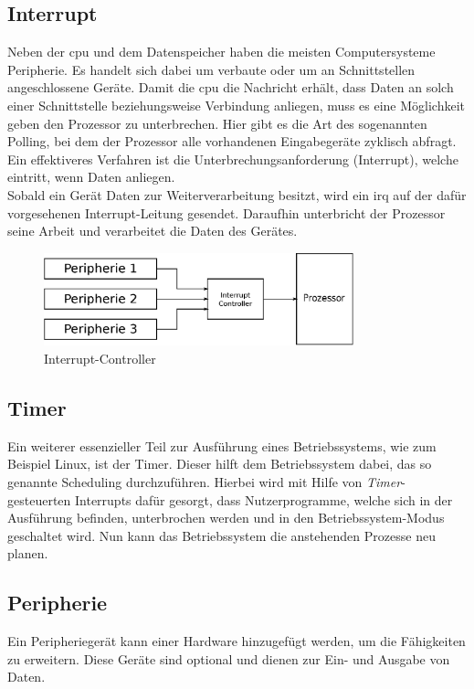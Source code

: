  \subsection{Interrupt}\label{kap:interrupt}
 Neben der \ac{cpu} und dem Datenspeicher haben die meisten Computersysteme Peripherie. Es handelt sich dabei um verbaute oder um an Schnittstellen angeschlossene Geräte.
 Damit die \ac{cpu} die Nachricht erhält, dass Daten an solch einer Schnittstelle beziehungsweise Verbindung anliegen, muss es eine Möglichkeit geben den Prozessor zu
 unterbrechen. Hier gibt es die Art des sogenannten Polling, bei dem der Prozessor alle vorhandenen Eingabegeräte zyklisch abfragt. Ein effektiveres Verfahren ist die
 Unterbrechungsanforderung (Interrupt), welche eintritt, wenn Daten anliegen. \\
 Sobald ein Gerät Daten zur Weiterverarbeitung besitzt, wird ein \ac{irq} auf der dafür vorgesehenen Interrupt-Leitung gesendet. Daraufhin unterbricht der Prozessor
 seine Arbeit und verarbeitet die Daten des Gerätes.\cite{irq}\\

 \begin{figure}[H]
 \centering
 \includegraphics[width=0.8\textwidth]{Hauptteil/irq.eps}
 \caption{Interrupt-Controller}\label{fig:irq}
 \end{figure}

 \subsection{Timer}\label{kap:timer}

 Ein weiterer essenzieller Teil zur Ausführung eines Betriebssystems, wie zum Beispiel Linux, ist der Timer. Dieser hilft dem Betriebssystem dabei, das so genannte Scheduling
 durchzuführen. Hierbei wird mit Hilfe von \emph{Timer}-gesteuerten Interrupts dafür gesorgt, dass Nutzerprogramme, welche sich in der Ausführung befinden, unterbrochen werden und
 in den Betriebssystem-Modus geschaltet wird. Nun kann das Betriebssystem die anstehenden Prozesse neu planen.\\

 \subsection{Peripherie}\label{kap:peripherie}
 Ein Peripheriegerät kann einer Hardware hinzugefügt werden, um die Fähigkeiten zu erweitern. Diese Geräte sind optional und dienen zur Ein- und Ausgabe von Daten.

